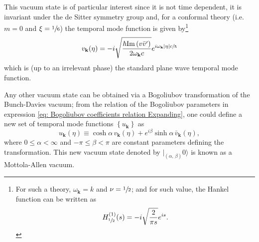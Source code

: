 This vacuum state is of particular interest \cite{VacuumdeSitter} since it is not time dependent, it is invariant under the de Sitter symmetry group and, for a conformal theory (i.e. $m=0$ and $\xi=\sfrac{1}{6}$) the temporal mode function is given by\footnote{For such a theory, $\omega_\mathbf{k}=k$ and $\nu=\sfrac{1}{2}$; and for such value, the Hankel function can be written as $$H^{(1)}_{\sfrac{1}{2}}(s)=-i\sqrt{\frac{2}{\pi s}}e^{is}.$$}
\begin{equation}
	v_\mathbf{k}(\eta)=-i\sqrt{\frac{\hbar\text{Im}\left( v\bar{v}'\right)}{ 2\omega_\mathbf{k}c}}e^{i\omega_\mathbf{k}|\eta|c\sfrac{}{\hbar}}
\end{equation}
which is (up to an irrelevant phase) the standard plane wave temporal mode function.

Any other vacuum state can be obtained via a Bogoliubov transformation of the Bunch-Davies vacuum; from the relation of the Bogoliubov parameters in expression \ref{eq: Bogoliubov coefficients relation Expanding}, one could define a new set of temporal mode functions $\left\{u_\mathbf{k}\right\}$ as
\begin{equation}
	u_\mathbf{k}(\eta)\equiv \cosh\alpha \,v_\mathbf{k}(\eta)+e^{i\beta}\sinh\alpha \,\bar{v}_\mathbf{k}(\eta),
\end{equation}
where $0\leq \alpha<\infty$ and $-\pi\leq\beta<\pi$ are constant parameters defining the transformation. This new vacuum state denoted by $|_{(\alpha,\,\beta)}0\rangle$ is known as a Mottola-Allen vacuum.
